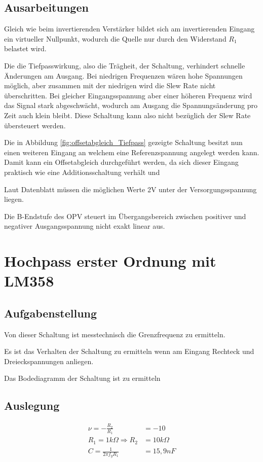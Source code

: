 \subsection{Ausarbeitungen}
Gleich wie beim invertierenden Verstärker bildet sich am invertierenden Eingang ein virtueller Nullpunkt,
wodurch die Quelle nur durch den Widerstand $R_1$ belastet wird.

Die die Tiefpasswirkung, also die Trägheit, der Schaltung, verhindert schnelle Änderungen am Ausgang. Bei
niedrigen Frequenzen wären hohe Spannungen möglich, aber zusammen mit der niedrigen wird die Slew Rate
nicht überschritten. Bei gleicher Eingangsspannung aber einer höheren Frequenz wird das Signal stark
abgeschwächt, wodurch am Ausgang die Spannungsänderung pro Zeit auch klein bleibt. Diese Schaltung kann also
nicht bezüglich der Slew Rate übersteuert werden.


Die in Abbildung \ref{fig:offsetabgleich_Tiefpass} gezeigte Schaltung besitzt nun einen weiteren Eingang an welchem eine Referenzspannung angelegt werden kann. Damit kann ein Offsetabgleich durchgeführt werden, da sich dieser Eingang praktisch wie eine Additionsschaltung verhält und 

Laut Datenblatt müssen die möglichen Werte 2V unter der Versorgungsspannung liegen.

Die B-Endstufe des OPV steuert im Übergangsbereich zwischen positiver und negativer Ausgangsspannung
nicht exakt linear aus.
\section{Hochpass erster Ordnung mit LM358}
\subsection{Aufgabenstellung}
Von dieser Schaltung ist messtechnisch die Grenzfrequenz zu ermitteln.

Es ist das Verhalten der Schaltung zu ermitteln wenn am Eingang Rechteck und Dreieckspannungen anliegen.

Das Bodediagramm der Schaltung ist zu ermitteln

\subsection{Auslegung}
\begin{align}
    \nu = -\frac{R_2}{R_1} &= -10\\
    R_1 = 1k\Omega \Rightarrow R_2 &= 10k\Omega\\
    C = \frac{1}{2\pi f_g R_1} &= 15,9nF
\end{align}
